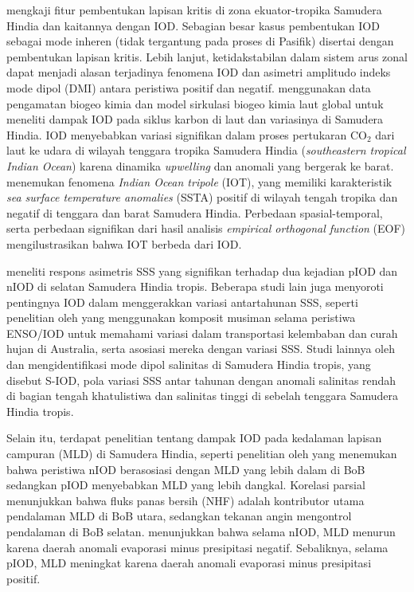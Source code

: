 \begin{spacing}{1.5}
	 mengkaji fitur pembentukan lapisan kritis di zona ekuator-tropika Samudera Hindia dan kaitannya dengan IOD. Sebagian besar kasus pembentukan IOD sebagai mode inheren (tidak tergantung pada proses di Pasifik) disertai dengan pembentukan lapisan kritis. Lebih lanjut, ketidakstabilan dalam sistem arus zonal dapat menjadi alasan terjadinya fenomena IOD dan asimetri amplitudo indeks mode dipol (DMI) antara peristiwa positif dan negatif.  menggunakan data pengamatan biogeo kimia dan model sirkulasi biogeo kimia laut global untuk meneliti dampak IOD pada siklus karbon di laut dan variasinya di Samudera Hindia. IOD menyebabkan variasi signifikan dalam proses pertukaran CO$_2$ dari laut ke udara di wilayah tenggara tropika Samudera Hindia (\textit{southeastern tropical Indian Ocean}) karena dinamika \textit{upwelling} dan anomali yang bergerak ke barat.  menemukan fenomena \textit{Indian Ocean tripole} (IOT), yang memiliki karakteristik \textit{sea surface temperature anomalies} (SSTA) positif di wilayah tengah tropika dan negatif di tenggara dan barat Samudera Hindia. Perbedaan spasial-temporal, serta perbedaan signifikan dari hasil analisis \textit{empirical orthogonal function} (EOF) mengilustrasikan bahwa IOT berbeda dari IOD. 
	
	 meneliti respons asimetris SSS yang signifikan terhadap dua kejadian pIOD dan nIOD di selatan Samudera Hindia tropis. Beberapa studi lain juga menyoroti pentingnya IOD dalam menggerakkan variasi antartahunan SSS, seperti penelitian oleh  yang menggunakan komposit musiman selama peristiwa ENSO/IOD untuk memahami variasi dalam transportasi kelembaban dan curah hujan di Australia, serta asosiasi mereka dengan variasi SSS. Studi lainnya oleh  dan  mengidentifikasi mode dipol salinitas di Samudera Hindia tropis, yang disebut S-IOD, pola variasi SSS antar tahunan dengan anomali salinitas rendah di bagian tengah khatulistiwa dan salinitas tinggi di sebelah tenggara Samudera Hindia tropis.
	
	Selain itu, terdapat penelitian tentang dampak IOD pada kedalaman lapisan campuran (MLD) di Samudera Hindia, seperti penelitian oleh  yang menemukan bahwa peristiwa nIOD berasosiasi dengan MLD yang lebih dalam di BoB sedangkan pIOD menyebabkan MLD yang lebih dangkal. Korelasi parsial menunjukkan bahwa fluks panas bersih (NHF) adalah kontributor utama pendalaman MLD di BoB utara, sedangkan tekanan angin mengontrol pendalaman di BoB selatan.  menunjukkan bahwa selama nIOD, MLD menurun karena daerah anomali evaporasi minus presipitasi negatif. Sebaliknya, selama pIOD, MLD meningkat karena daerah anomali evaporasi minus presipitasi positif. 
	

\end{spacing}
